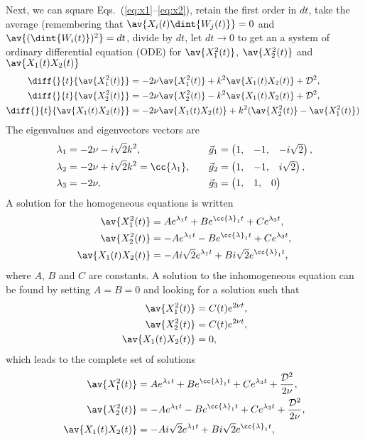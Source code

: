 \documentclass[10pt,a4paper]{article}
\newcommand{\eqs}[2]{Eqs.~(\ref{#1}--\ref{#2})}
\newcommand{\src}{\ensuremath{\mathcal{D}}}
\newcommand{\ODE}{\renewcommand{\ODE}{ODE\xspace}ordinary differential equation (ODE)\xspace}
\begin{document}
Next, we can square \eqs{eq:x1}{eq:x2}, retain the first order in $dt$,
take the average (remembering that $\av{X_i(t)\dint{W_j(t)}}=0$ and
$\av{(\dint{W_i(t)})^2}=dt$, divide by $dt$, let $dt\rightarrow0$ to get an
a system of \ODE for $\av{X_1^2(t)}$, $\av{X_2^2(t)}$ and $\av{X_1(t)X_2(t)}$
\begin{align}
\diff{}{t}{\av{X_1^2(t)}} &= -2\nu\av{X_1^2(t)}+k^2\av{X_1(t)X_2(t)}+\src^2,
\label{eq:m2x1}\\
\diff{}{t}{\av{X_2^2(t)}} &= -2\nu\av{X_2^2(t)}-k^2\av{X_1(t)X_2(t)}+\src^2,
\label{eq:m2x2}\\
\diff{}{t}{\av{X_1(t)X_2(t)}} &=
-2\nu\av{X_1(t)X_2(t)}+k^2(\av{X_2^2(t)}-\av{X_1^2(t)})
\label{eq:m2x1x2}\
\end{align}
The eigenvalues and eigenvectors vectors are
\begin{align}
\lambda_1 &= -2\nu-i\sqrt{2}k^2,&\quad
\vec{g}_1 &=\begin{pmatrix}1,&-1,&-i\sqrt{2}\end{pmatrix},\\
\lambda_2 &= -2\nu+i\sqrt{2}k^2 = \cc{\lambda_1},&\quad
\vec{g}_2 &=\begin{pmatrix}1,&-1,&i\sqrt{2}\end{pmatrix},\\
\lambda_3 &= -2\nu,&\quad
\vec{g}_3 &=\begin{pmatrix}1,&1,&0\end{pmatrix}
\end{align}
A solution for the homogeneous equations is written
\begin{align}
\av{X_1^2(t)} &= 
Ae^{\lambda_1 t} +Be^{\cc{\lambda}_1 t}+Ce^{\lambda_3 t},\\
\av{X_2^2(t)} &= 
-Ae^{\lambda_1 t} -Be^{\cc{\lambda}_1 t}+Ce^{\lambda_3 t},\\
\av{X_1(t)X_2(t)} &= 
-Ai\sqrt{2}e^{\lambda_1 t} +Bi\sqrt{2}e^{\cc{\lambda}_1 t},
\end{align}
where $A$, $B$ and $C$ are constants.
A solution to the inhomogeneous equation can be found by setting
$A=B=0$ and looking for a solution such that
\begin{align}
\av{X_1^2(t)} &= C(t)e^{2\nu t},\\
\av{X_2^2(t)} &= C(t)e^{2\nu t},\\
\av{X_1(t)X_2(t)} &= 0,
\end{align}
which leads to the complete set of solutions 
\begin{align}
\av{X_1^2(t)} &= 
Ae^{\lambda_1 t}+Be^{\cc{\lambda}_1 t}+Ce^{\lambda_3 t}+\frac{\src^2}{2\nu},\\
\av{X_2^2(t)} &= 
-Ae^{\lambda_1 t}-Be^{\cc{\lambda}_1 t}+Ce^{\lambda_3 t}+\frac{\src^2}{2\nu},\\
\av{X_1(t)X_2(t)} &= 
-Ai\sqrt{2}e^{\lambda_1 t} +Bi\sqrt{2}e^{\cc{\lambda}_1 t},
\end{align}
\end{document}
